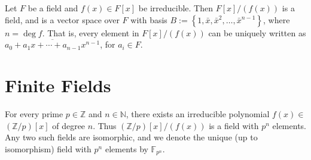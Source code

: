 \begin{theorem}
Let \(F\) be a field and \(f(x) \in F[x]\) be irreducible. Then \(F[x] /(f(x))\) is a field, and is a vector space over \(F\) with basis \(B:=\left\{1, \bar{x}, \bar{x}^2, \ldots, \bar{x}^{n-1}\right\}\), where \(n=\operatorname{deg} f\). That is, every element in \(F[x] /(f(x))\) can be uniquely written as \(\overline{a_0+a_1 x+\cdots+a_{n-1} x^{n-1}}\), for \(a_i \in F\).
\end{theorem}

\begin{proofidea}
  
  
\end{proofidea}
  
\begin{formalproof}
  
\end{formalproof} 

\section{Finite Fields}

\begin{theorem}
For every prime \(p \in \mathbb{Z}\) and \(n \in \mathbb{N}\), there exists an irreducible polynomial \(f(x) \in\) \((\mathbb{Z} / p)[x]\) of degree \(n\). Thus \((\mathbb{Z} / p)[x] /(f(x))\) is a field with \(p^n\) elements. Any two such fields are isomorphic, and we denote the unique (up to isomorphism) field with \(p^n\) elements by \(\mathbb{F}_{p^n}\).
\end{theorem}


